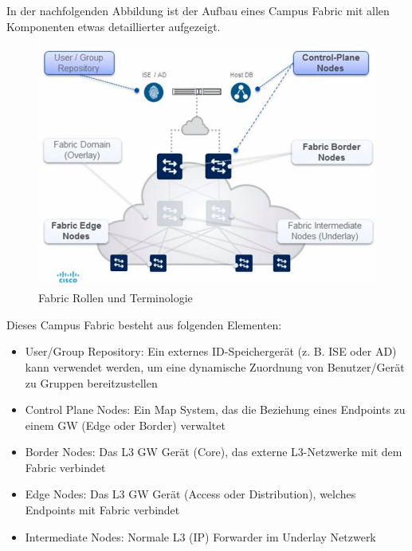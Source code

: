 In der nachfolgenden Abbildung ist der Aufbau eines Campus Fabric mit allen Komponenten etwas detaillierter aufgezeigt.

\begin{figure}[H]
	\centering
	\includegraphics[height=8cm]{img/fabric-roles&terminology.jpg}
	\caption{Fabric Rollen und Terminologie \cite{webinar-sda-troubleshooting}}
	\label{fig:Fabric Rollen und Terminologie}
\end{figure}

Dieses Campus Fabric besteht aus folgenden Elementen: \cite{webinar-sda-troubleshooting}
\begin{itemize}	
	\item User/Group Repository: Ein externes ID-Speichergerät (z. B. ISE oder AD) kann verwendet werden, um eine dynamische Zuordnung von Benutzer/Gerät zu Gruppen bereitzustellen
	\item Control Plane Nodes: Ein Map System, das die Beziehung eines Endpoints zu einem GW (Edge oder Border) verwaltet
	\item Border Nodes: Das L3 GW Gerät (Core), das externe L3-Netzwerke mit dem Fabric verbindet
	\item Edge Nodes: Das L3 GW Gerät (Access oder Distribution), welches Endpoints mit Fabric verbindet
	\item Intermediate Nodes: Normale L3 (IP) Forwarder im Underlay Netzwerk
\end{itemize}

